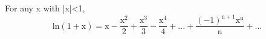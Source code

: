 For any x with |x|<1,
\[ \mathrm{ln(1+x)}
= 
\mathrm{x}
- \frac{\mathrm{x}^2}{2}
+ \frac{\mathrm{x}^3}{3}
- \frac{\mathrm{x}^4}{4}
+ ...
+ \frac{ (-1)^{\mathrm{n}+1} \mathrm{x}^{\mathrm{n}}}{\mathrm{n}}
+ ...  \]